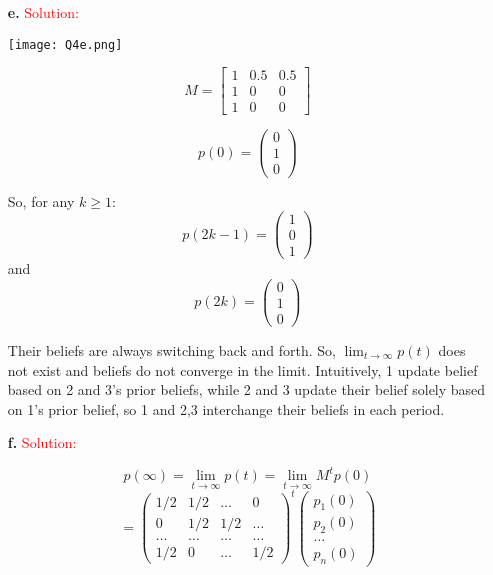 \documentclass[11pt]{article} %
\begin{document}
\begin{itemize}
\item[\textbf{e. }]  
\textcolor{red}{Solution:}

 \begin{center}
\texttt{[image: Q4e.png]}
\end{center}
$$M=\left[ \begin{array}{ccc}
1& 0.5 & 0.5 \\
1 & 0 & 0  \\
1 &  0  & 0  \end{array} \right]$$

$$p(0)=\left( \begin{array}{c}
0 \\
1 \\
0
\end{array}\right)$$

So, for any $k \ge 1$:
$$p(2k-1)=\left( \begin{array}{c}
1 \\
0 \\
1
\end{array}\right)$$
and
$$p(2k)=\left( \begin{array}{c}
0 \\
1 \\
0
\end{array}\right)$$

Their beliefs are always switching back and forth. So, $\lim_{t \to \infty}p(t)$ does not exist and beliefs do not converge in the limit. Intuitively, 1 update belief based on 2 and 3's prior beliefs, while 2 and 3 update their belief solely based on 1's prior belief, so 1 and 2,3 interchange their beliefs in each period.

\item[\textbf{f. }]  
\textcolor{red}{Solution:}

$$p(\infty)=\lim_{t \to \infty} p(t) = \lim_{t \to \infty} M^t p(0) $$
$$=\left( \begin{array}{cccc}
1/2 & 1/2 &  \hdots & 0 \\
0 & 1/2 & 1/2 & \hdots   \\ 
\hdots & \hdots & \hdots & \hdots \\
1/2 & 0 &  \hdots & 1/2
\end{array}\right)^t 
\left( \begin{array}{c}
p_1(0) \\
p_2(0) \\
\hdots \\
p_n(0)
\end{array}\right)  $$


\end{itemize}
\end{document}
